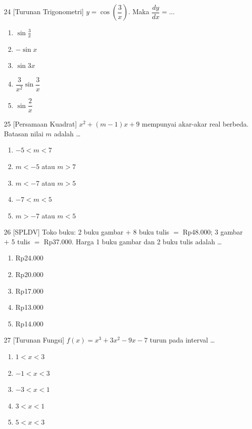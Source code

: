 \documentclass[11pt]{article}
\newenvironment{pil}{%
  \begin{enumerate}[label=(\alph*),leftmargin=*,itemsep=1pt,topsep=3pt]}%
  {\end{enumerate}}
\begin{document}
\begin{soal}{24 \normalfont\small[Turunan Trigonometri]}
$y=\cos\!\left(\dfrac3x\right)$. Maka $\dfrac{dy}{dx}=\ldots$
\begin{pil}
  \item $\sin\tfrac3x$ \item $-\sin x$
  \item $\sin3x$ \item $\dfrac{3}{x^2}\sin\dfrac3x$ \item $\sin\dfrac2x$
\end{pil}
\end{soal}

\begin{soal}{25 \normalfont\small[Persamaan Kuadrat]}
$x^2+(m-1)x+9$ mempunyai akar-akar real berbeda. Batasan nilai $m$ adalah \ldots
\begin{pil}
  \item $-5<m<7$ \item $m<-5$ atau $m>7$
  \item $m<-7$ atau $m>5$ \item $-7<m<5$ \item $m>-7$ atau $m<5$
\end{pil}
\end{soal}

\begin{soal}{26 \normalfont\small[SPLDV]}
Toko buku: 2 buku gambar $+$ 8 buku tulis $=$ Rp48.000; 3 gambar $+$ 5 tulis $=$ Rp37.000.
Harga 1 buku gambar dan 2 buku tulis adalah \ldots
\begin{pil}
  \item Rp24.000 \item Rp20.000 \item Rp17.000 \item Rp13.000 \item Rp14.000
\end{pil}
\end{soal}

\begin{soal}{27 \normalfont\small[Turunan Fungsi]}
$f(x)=x^3+3x^2-9x-7$ turun pada interval \ldots
\begin{pil}
  \item $1<x<3$ \item $-1<x<3$
  \item $-3<x<1$ \item $3<x<1$ \item $5<x<3$
\end{pil}
\end{soal}
\end{document}
